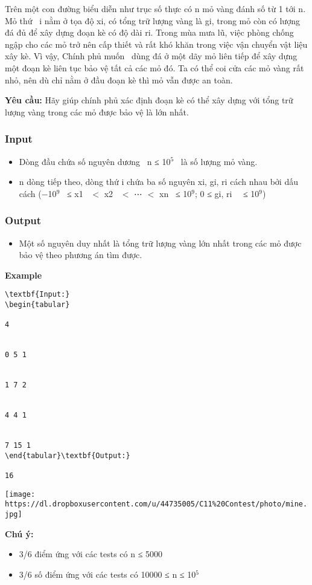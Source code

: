 

Trên một con đường biểu diễn như trục số thực có n mỏ vàng đánh số từ 1 tới n. Mỏ thứ  i nằm ở tọa độ xi, có tổng trữ lượng vàng là gi, trong mỏ còn có lượng đá đủ để xây dựng đoạn kè có độ dài ri. Trong mùa mưa lũ, việc phòng chống ngập cho các mỏ trở nên cấp thiết và rất khó khăn trong việc vận chuyển vật liệu xây kè. Vì vậy, Chính phủ muốn  dùng đá ở một dãy mỏ liên tiếp để xây dựng một đoạn kè liên tục bảo vệ tất cả các mỏ đó. Ta có thể coi cửa các mỏ vàng rất nhỏ, nên dù chỉ nằm ở đầu đoạn kè thì mỏ vẫn được an toàn.

\textbf{Yêu cầu: }Hãy giúp chính phủ xác định đoạn kè có thể xây dựng với tổng trữ lượng vàng trong các mỏ được bảo vệ là lớn nhất.

\subsubsection{Input}
\begin{itemize}
	\item Dòng đầu chứa số nguyên dương  n ≤ 10$^5$  là số lượng mỏ vàng.
	\item n dòng tiếp theo, dòng thứ i chứa ba số nguyên xi, gi, ri cách nhau bởi dấu cách (−10$^9$  ≤ x1  $<$ x2  $<$ ⋯ $<$ xn  ≤ 10$^9$; 0 ≤ gi, ri   ≤ 10$^9$)
\end{itemize}

\subsubsection{Output}
\begin{itemize}
	\item Một số nguyên duy nhất là tổng trữ lượng vàng lớn nhất trong các mỏ được bảo vệ theo phương án tìm được.
\end{itemize}

\textbf{Example}
\begin{verbatim}
\textbf{Input:}
\begin{tabular}

4  


0 5 1  


1 7 2  


4 4 1  


7 15 1
\end{tabular}\textbf{Output:}

16\end{verbatim}


\texttt{[image: https://dl.dropboxusercontent.com/u/44735005/C11\%20Contest/photo/mine.jpg]}

\textbf{Chú ý:}
\begin{itemize}
	\item 3/6 điểm ứng với các tests có n ≤ 5000 
	\item 3/6 số điểm ứng với các tests có 10000 ≤ n ≤ 10$^5$
\end{itemize}
